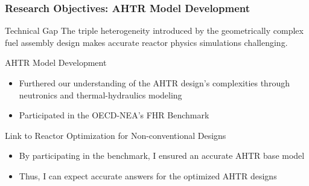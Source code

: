 \begin{frame}
  \frametitle{Research Objectives: AHTR Model Development}
  \begin{block}{Technical Gap}
      The triple heterogeneity introduced by the geometrically complex 
      fuel assembly design makes accurate reactor physics simulations challenging. 
  \end{block}
  \begin{block}{AHTR Model Development}
    \begin{itemize}
      \item Furthered our understanding of the AHTR design's complexities 
      through neutronics and thermal-hydraulics modeling
      \item Participated in the OECD-NEA's FHR Benchmark 
    \end{itemize}
  \end{block}
  \begin{block}{Link to Reactor Optimization for Non-conventional Designs}
  \begin{itemize}
    \item By participating in the benchmark, I ensured an accurate AHTR base model
    \item Thus, I can expect accurate answers for the optimized AHTR designs
  \end{itemize}
  \end{block}
\end{frame}